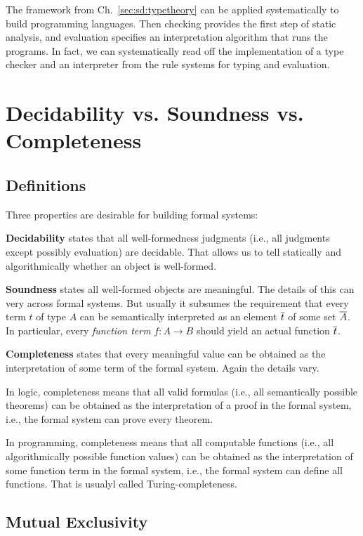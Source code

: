 The framework from Ch.~\ref{sec:sd:typetheory} can be applied systematically to build programming languages.
Then checking provides the first step of static analysis, and evaluation specifies an interpretation algorithm that runs the programs.
In fact, we can systematically read off the implementation of a type checker and an interpreter from the rule systems for typing and evaluation.

\section{Decidability vs. Soundness vs. Completeness}

\subsection{Definitions}
Three properties are desirable for building formal systems:

\textbf{Decidability} states that all well-formedness judgments (i.e., all judgments except possibly evaluation) are decidable.
That allows us to tell statically and algorithmically whether an object is well-formed.

\textbf{Soundness} states all well-formed objects are meaningful.
The details of this can very across formal systems.
But usually it subsumes the requirement that every term $t$ of type $A$ can be semantically interpreted as an element $\overline{t}$ of some set $\overline{A}$.
In particular, every \emph{function term} $f:A\to B$ should yield an actual function $\overline{t}$.

\textbf{Completeness} states that every meaningful value can be obtained as the interpretation of some term of the formal system.
Again the details vary.
\begin{compactitem}
\item In logic, completeness means that all valid formulas (i.e., all semantically possible theorems) can be obtained as the interpretation of a proof in the formal system, i.e., the formal system can prove every theorem.
\item In programming, completeness means that all computable functions (i.e., all algorithmically possible function values) can be obtained as the interpretation of some function term in the formal system, i.e., the formal system can define all functions.
That is usualyl called Turing-completeness.
\end{compactitem}

\subsection{Mutual Exclusivity}

